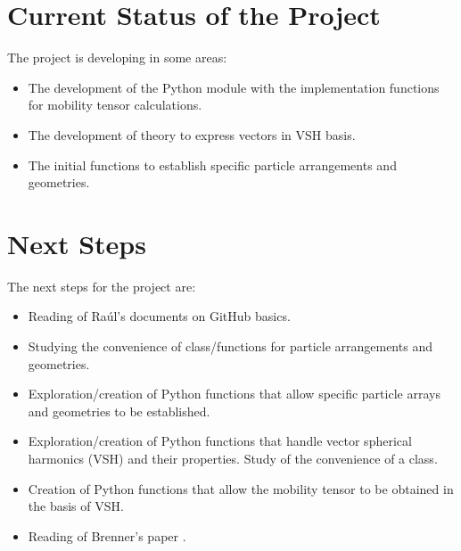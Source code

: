 \documentclass[12pt]{article}
\begin{document}
\section {Current Status of the Project}
The project is developing in some areas:
\begin{itemize}
    \item The development of the Python module with the implementation functions for mobility tensor calculations.
    \item The development of theory to express vectors in VSH basis.
    \item The initial functions to establish specific particle arrangements and geometries.
\end{itemize}

\section{Next Steps}
The next steps for the project are:
\begin{itemize}
    \item Reading of Raúl's documents on GitHub basics.
    \item Studying the convenience of class/functions for particle arrangements and geometries.
    \item Exploration/creation of Python functions that allow specific particle arrays and geometries to be established.
    \item Exploration/creation of Python functions that handle vector spherical harmonics (VSH) and their properties. Study of the convenience of a class.
    \item Creation of Python functions that allow the mobility tensor to be obtained in the basis of VSH.
    \item Reading of Brenner's paper \cite{BRENNER1961242}.
\end{itemize}

\printbibliography
\end{document}
